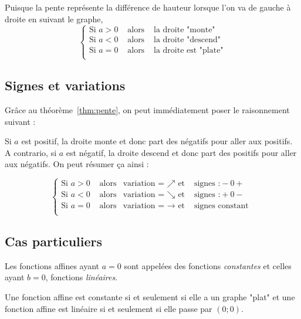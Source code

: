 Puisque la pente représente la différence de hauteur lorsque l'on va de gauche à droite en suivant le graphe, 
$$
\left\{
\begin{array}{lcl}
\mbox{Si } a>0 &\mbox{ alors} &\mbox{ la droite "monte"}\\
\mbox{Si } a<0 &\mbox{ alors} &\mbox{ la droite "descend"}\\
\mbox{Si } a=0 &\mbox{ alors} &\mbox{ la droite est "plate"}\\
\end{array}
\right.
$$


\subsection{Signes et variations}

Grâce au théorème~\ref{thm:pente}, on peut immédiatement poser le raisonnement suivant :

Si $a$ est positif, la droite monte et donc part des négatifs pour aller aux positifs. A contrario, si $a$ est négatif, la droite descend et donc part des positifs pour aller aux négatifs. On peut résumer ça ainsi :

$$
\left\{
\begin{array}{lcll}
\mbox{Si } a>0 &\mbox{ alors} &\mbox{variation = } \nearrow \mbox{ et }& \mbox{signes :} - 0 +\\
\mbox{Si } a<0 &\mbox{ alors} &\mbox{variation = } \searrow \mbox{ et }& \mbox{signes :} + 0 -\\
\mbox{Si } a=0 &\mbox{ alors} &\mbox{variation = } \rightarrow \mbox{ et }& \mbox{signes constant }\\
\end{array}
\right.
$$

\subsection{Cas particuliers}

\begin{definition}
Les fonctions affines ayant $a=0$ sont appelées des fonctions \emph{constantes} et celles ayant $b=0$, fonctions \emph{linéaires}.
\end{definition}

\begin{proposition}
Une fonction affine est constante si et seulement si elle a un graphe "plat" et une fonction affine est linéaire si et seulement si elle passe par $(0;0)$.
\end{proposition}

